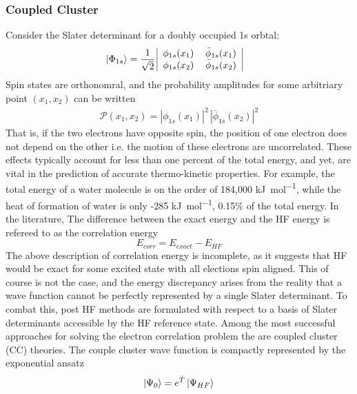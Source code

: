 \subsubsection{Coupled Cluster}
Consider the Slater determinant for a doubly occupied 1s orbtal:
\begin{align}
\ket{\Phi_{1s}}&=\frac{1}{\sqrt{2}} \,
\begin{tabular}{|c c|}
$\phi_{1s}(x_1)$ & $\bar{\phi}_{1s}(x_1)$ \\
$\phi_{1s}(x_2)$ & $\bar{\phi}_{1s}(x_2)$\\
\end{tabular}
\end{align}
Spin states are orthonomral, and the probability amplitudes for some arbitriary point $(x_1,x_2)$ can be written  \begin{align} 
\mathcal{P}(x_1, x_2) = |\phi_{1s}(x_1)|^2 \, |\bar{\phi}_{1s}(x_2) |^2
\end{align}
That is, if the two electrons have opposite spin, the position of one electron does not depend on the other\cite{S&O} i.e. the motion of these electrons are uncorrelated. These effects typically account for less than one percent of the total energy, and yet, are vital in the prediction of accurate thermo-kinetic properties. For example, the total energy of a water molecule is on the order of 184,000 \si{\kilo\joule\per\mol}, while the heat of formation of water is only -285 \si{\kilo\joule\per\mol}, 0.15\% of the total energy. In the literature, The difference between the exact energy and the HF energy is refereed to as the correlation energy
\begin{equation}
E_{corr} = E_{exact} - E_{HF}
\end{equation}
The above description of correlation energy is incomplete, as it suggests that HF would be exact for some excited state with all elections spin aligned. This of course is not the case, and the energy discrepancy arises from the reality that a wave function cannot be perfectly represented by a single Slater determinant. To combat this, post HF methods are formulated with respect to a basis of Slater determinants accessible by the HF reference state. Among the most successful approaches for solving the electron correlation problem the are coupled cluster (CC) theories. 
The couple cluster wave function is compactly represented by the exponential ansatz
\begin{equation}
\ket{\Psi_0} = e^{\hat{T}} \ket{\Psi_{HF}} \label{eq:expansatz}
\end{equation}
